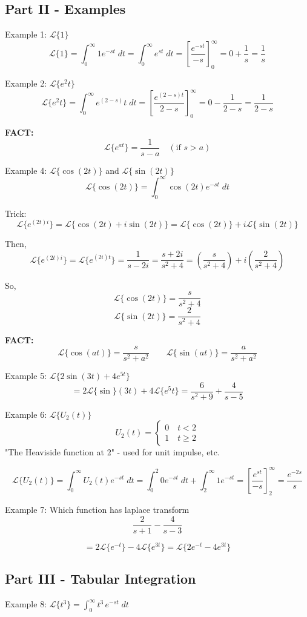 \documentclass[12pt]{article}
\renewcommand{\L}[1]{\mathcal{L}\{#1\}}
\begin{document}
\subsection*{Part II - Examples}
Example 1: $\mathcal{L}\{1\}$
\[\mathcal{L}\{1\} = \int_0^{\infty} 1e^{-st} \; dt = \int_0^{\infty} e^{st} \; dt = \left[\frac{e^{-st}}{-s}\right]_0^{\infty} = 0 + \frac{1}{s} = \boxed{\frac{1}{s}}\]

Example 2: $\mathcal{L}\{e^2t\}$
\[\mathcal{L}\{e^2t\} = \int_0^\infty e^(2- s) t\; dt = \left[\frac{e^{(2 - s)t}}{2 -s}\right]_0^\infty = 0 - \frac{1}{2 - s} = \boxed{\frac{1}{2 - s}}\]

\textbf{FACT:}
\[\boxed{\mathcal{L}\{e^{at}\} = \frac{1}{s - a} \quad (\text{if } s > a)}\]

Example 4: $\mathcal{L}\{\cos(2t)\}$ and $\mathcal{L}\{\sin (2t)\}$
\[\mathcal{L}\{\cos(2t)\} = \int_0^\infty \cos (2t) e^{-st}\; dt \]

Trick:
\[\mathcal{L}\{e^{(2t)i}\} = \mathcal{L}\{\cos (2t) + i \sin (2t)\} = \mathcal{L}\{\cos (2t)\} + i \mathcal{L}\{\sin (2t)\}\]

Then, 
\[\mathcal{L}\{e^{(2t)i}\} = \mathcal{L}\{e^{(2i)t}\} = \frac{1}{s - 2i} = \frac{s + 2i}{s^2 + 4} = \left(\frac{s}{s^2 + 4}\right) + i\left(\frac{2}{s^2 + 4}\right)\]

So,
\[\L{\cos(2t)} = \frac{s}{s^2 + 4}\]
\[\L{\sin(2t)} = \frac{2}{s^2 + 4}\]

\textbf{FACT:}
\[\boxed{\L{\cos(at)} = \frac{s}{s^2 + a^2} \quad \quad \L{\sin (at)} = \frac{a}{s^2 + a^2}}\]

Example 5: $\L{2 \sin (3t) + 4e^{5t}}$
\[= 2 \L \sin(3t) + 4 \L{e^5t} = \boxed{\frac{6}{s^2 + 9} + \frac{4}{s - 5}}\]

Example 6: $\L{U_2(t)}$
\[U_2(t) = \begin{cases}
    0 \quad t < 2\\
    1 \quad t \geq 2
\end{cases}\]
"The Heaviside function at 2" - used for unit impulse, etc. 

\[\L{U_2(t)} = \int_0^\infty U_2(t) e^{-st} \; dt =  \int_0^2 0 e^{-st} \; dt + \int_2^\infty 1 e^{-st} = \left[\frac{e^{st}}{-s}\right]_2^\infty = \boxed{\frac{e^{-2s}}{s}}\]

Example 7: Which function has laplace transform 
\[\frac{2}{s + 1} - \frac{4}{s - 3}\] 

\[= 2\L{e^{-t}} - 4 \L{e^{3t}} = \boxed{\L{2e^{-t} - 4e^{3t}}}\]

\subsection*{Part III - Tabular Integration}
Example 8: $\L{t^3} = \int_0^\infty t^3 \, e^{-st} \; dt$
\end{document}
